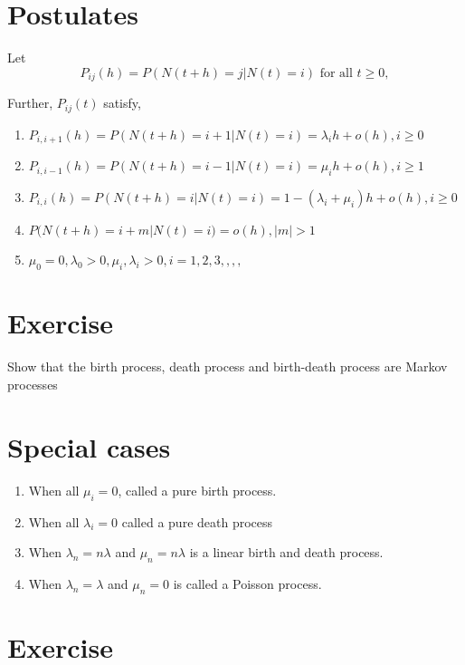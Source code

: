 \documentclass[
  letterpaper,
  DIV=11,
  numbers=noendperiod]{scrreprt}
\begin{document}
\section{Postulates}\label{postulates}

Let \[P_{ij}(h) = P(N(t+h) = j|N(t) = i)\text{ for all }t \geq 0,\]

Further, \(P_{ij}(t)\) satisfy,

\begin{enumerate}
\def\labelenumi{\arabic{enumi}.}
\item
  \(P_{i, i+1}(h) = P(N(t+h) = i+1|N(t)=i) = \lambda_ih + o(h), i \geq 0\)
\item
  \(P_{i, i-1}(h)=P(N(t+h) = i-1|N(t)=i) = \mu_ih + o(h), i \geq 1\)
\item
  \(P_{i, i}(h)= P(N(t+h) = i|N(t)=i) = 1- (\lambda_i + \mu_i)h + o(h), i \geq 0\)
\item
  \(P(N(t+h) = i+m|N(t)=i) = o(h), |m| > 1\)
\item
  \(\mu_0 = 0, \lambda_0 > 0, \mu_i, \lambda_i > 0, i=1, 2, 3,,,,\)
\end{enumerate}

\section{Exercise}\label{exercise-2}

Show that the birth process, death process and birth-death process are
Markov processes

\section{Special cases}\label{special-cases}

\begin{enumerate}
\def\labelenumi{\arabic{enumi}.}
\item
  When all \(\mu_i = 0\), called a pure birth process.
\item
  When all \(\lambda_i = 0\) called a pure death process
\item
  When \(\lambda_n = n\lambda\) and \(\mu_n = n\lambda\) is a linear
  birth and death process.
\item
  When \(\lambda_n = \lambda\) and \(\mu_n = 0\) is called a Poisson
  process.
\end{enumerate}

\section{Exercise}\label{exercise-3}
\end{document}
